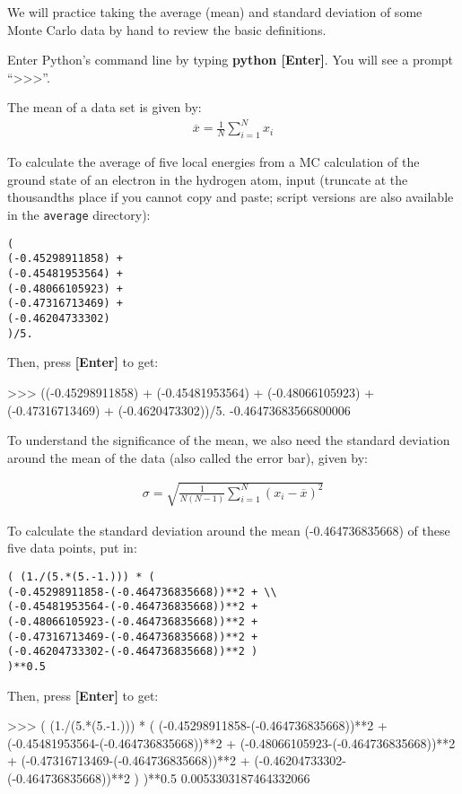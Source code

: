 We will practice taking the average (mean) and standard deviation of some Monte
Carlo data by hand to review the basic definitions.

Enter Python's command line by typing \textbf{python [Enter]}.
You will see a prompt ``\textgreater\textgreater\textgreater''.

The mean of a data set is given by:
\begin{align}
  \overline{x} = \frac{1}{N}\sum_{i=1}^{N} x_i
\end{align}

To calculate the average of five local energies from a MC calculation of the
ground state of an electron in the hydrogen atom, input (truncate at the
thousandths place if you cannot copy and paste; script versions are also
available in the \texttt{average} directory): 

\begin{lstlisting}[style=SHELL]
(
(-0.45298911858) + 
(-0.45481953564) + 
(-0.48066105923) + 
(-0.47316713469) + 
(-0.46204733302)
)/5.
\end{lstlisting} 

Then, press \textbf{[Enter]} to get:

\begin{shade}
>>> ((-0.45298911858) + (-0.45481953564) + (-0.48066105923) + 
(-0.47316713469) + (-0.4620473302))/5.  
-0.46473683566800006
\end{shade}

To understand the significance of the mean, we also need the standard deviation
around the mean of the data (also called the error bar), given by:

\begin{align}
  \sigma = \sqrt{\frac{1}{N(N-1)}\sum_{i=1}^{N} ({x_i} - \overline{x})^2}
\end{align}

To calculate the standard deviation around the mean (-0.464736835668) of these
five data points, put in: 

\begin{lstlisting}[style=SHELL]
( (1./(5.*(5.-1.))) * ( 
(-0.45298911858-(-0.464736835668))**2 + \\
(-0.45481953564-(-0.464736835668))**2 + 
(-0.48066105923-(-0.464736835668))**2 + 
(-0.47316713469-(-0.464736835668))**2 + 
(-0.46204733302-(-0.464736835668))**2 ) 
)**0.5
\end{lstlisting} 

Then, press \textbf{[Enter]} to get:

\begin{shade}
>>> ( (1./(5.*(5.-1.))) * ( (-0.45298911858-(-0.464736835668))**2 +
(-0.45481953564-(-0.464736835668))**2 + (-0.48066105923-(-0.464736835668))**2 + 
(-0.47316713469-(-0.464736835668))**2 + (-0.46204733302-(-0.464736835668))**2 
) )**0.5
0.0053303187464332066
\end{shade}

